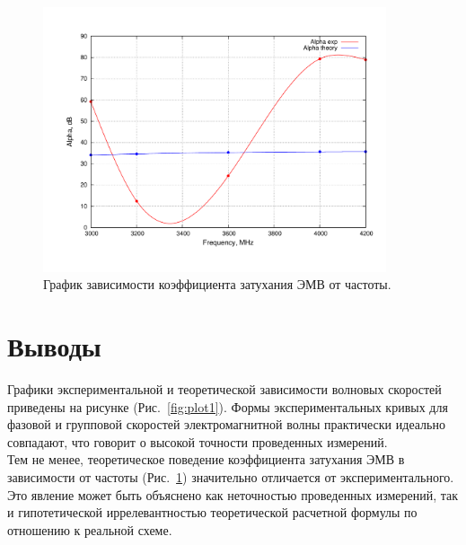 \documentclass[11pt,a4paper,oneside, reqno]{amsproc}
\begin{document}
\begin{figure}[h!]
    \begin{center}
        \includegraphics[width=0.90\textwidth]{plot2.pdf}
    \end{center}
    \caption{График зависимости коэффициента затухания ЭМВ от частоты.}
    \label{fig:plot2}
\end{figure}

\newpage
\section{Выводы}
Графики экспериментальной и теоретической зависимости волновых скоростей
приведены на рисунке
(Рис.~\ref{fig:plot1}).
Формы экспериментальных кривых для фазовой и групповой скоростей электромагнитной волны
практически идеально совпадают, что говорит о высокой точности проведенных измерений.\\

Тем не менее, теоретическое поведение коэффициента затухания ЭМВ в зависимости от
частоты (Рис.~\ref{fig:plot2}) значительно отличается от экспериментального. Это явление может быть объяснено
как неточностью проведенных измерений, так и гипотетической иррелевантностью теоретической
расчетной формулы по отношению к реальной схеме. 
\end{document}
